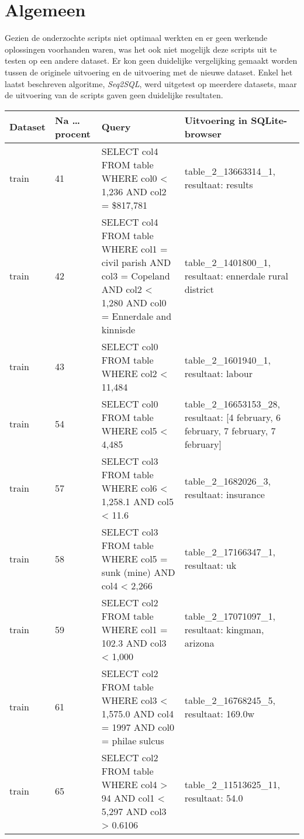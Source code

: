 \section{Algemeen}

Gezien de onderzochte scripts niet optimaal werkten en er geen werkende oplossingen voorhanden waren, was het ook niet mogelijk deze scripts uit te testen op een andere dataset. Er kon geen duidelijke vergelijking gemaakt worden tussen de originele uitvoering en de uitvoering met de nieuwe dataset. Enkel het laatst beschreven algoritme, \textit{Seq2SQL}, werd uitgetest op meerdere datasets, maar de uitvoering van de scripts gaven geen duidelijke resultaten.

\begin{table}[]
	\centering
	\begin{tabular}{ | l | l | p{5cm} | p{5cm} |}
		\hline
		Dataset & Na \dots procent & Query & Uitvoering in SQLite-browser \\ \hline
		train 	& 41 			   & SELECT col4 FROM table WHERE col0 < 1,236 AND col2 = \$817,781 & table\_2\_13663314\_1, resultaat: results  \\ \hline
		train 	& 42 			   & SELECT col4 FROM table WHERE col1 = civil parish AND col3 = Copeland AND col2 < 1,280 AND col0 = Ennerdale and kinnisde  & table\_2\_1401800\_1, resultaat: ennerdale rural district  \\ \hline
		train 	& 43 			   & SELECT col0 FROM table WHERE col2 < 11,484 & table\_2\_1601940\_1, resultaat: labour  \\ \hline
		train 	& 54 			   & SELECT col0 FROM table WHERE col5 < 4,485 & table\_2\_16653153\_28, resultaat: [4 february, 6 february, 7 february, 7 february]  \\ \hline
		train 	& 57 			   & SELECT col3 FROM table WHERE col6 < 1,258.1 AND col5 < 11.6 & table\_2\_1682026\_3, resultaat: insurance  \\ \hline
		train 	& 58 			   & SELECT col3 FROM table WHERE col5 = sunk (mine) AND col4 < 2,266 & table\_2\_17166347\_1, resultaat: uk  \\ \hline
		train 	& 59 			   & SELECT col2 FROM table WHERE col1 = 102.3 AND col3 < 1,000 & table\_2\_17071097\_1, resultaat: kingman, arizona  \\ \hline
		train 	& 61 			   & SELECT col2 FROM table WHERE col3 < 1,575.0 AND col4 = 1997 AND col0 = philae sulcus & table\_2\_16768245\_5, resultaat: 169.0w  \\ \hline
		train 	& 65 			   & SELECT col2 FROM table WHERE col4 > 94 AND col1 < 5,297 AND col3 > 0.6106 & table\_2\_11513625\_11, resultaat: 54.0  \\ \hline

\end{tabular}
\end{table}
